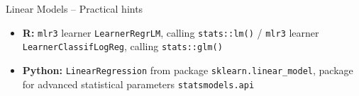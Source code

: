 \begin{frame}{Linear Models -- Practical hints}





\begin{itemize}
  \item \textbf{R:} \texttt{mlr3} learner \texttt{LearnerRegrLM}, calling 
  \texttt{stats::lm()} / \texttt{mlr3} learner \texttt{LearnerClassifLogReg}, 
  calling \texttt{stats::glm()}
  \item \textbf{Python:} \texttt{LinearRegression} from package 
  \texttt{sklearn.linear\_model}, package for advanced statistical parameters 
  \texttt{statsmodels.api} 
\end{itemize}

\end{frame}